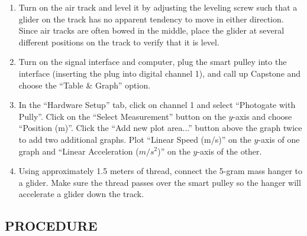 \begin{enumerate}[label=\arabic*.]

\item Turn on the air track and level it by adjusting the leveling screw such that a glider on the track has no apparent tendency to move in either direction.  Since air tracks are often bowed in the middle, place the glider at several different positions on the track to verify that it is level.

\item Turn on the signal interface and computer, plug the smart pulley into the interface (inserting the plug into digital channel 1), and call up Capstone and choose the ``Table \& Graph'' option.

\item In the ``Hardware Setup'' tab, click on channel 1 and select ``Photogate with Pully''.  Click on the ``Select Measurement'' button on the \(y\)-axis and choose ``Position (m)''.  Click the ``Add new plot area...'' button above the graph twice to add two additional graphs.  Plot ``Linear Speed (m/s)'' on the  \(y\)-axis of one graph and ``Linear Acceleration ($m/s^2$)'' on the \(y\)-axis of the other.

\item Using approximately 1.5 meters of thread, connect the 5-gram mass hanger to a glider.  Make sure the thread passes over the smart pulley so the hanger will accelerate a glider down the track.

\end{enumerate}

\subsection*{PROCEDURE}

